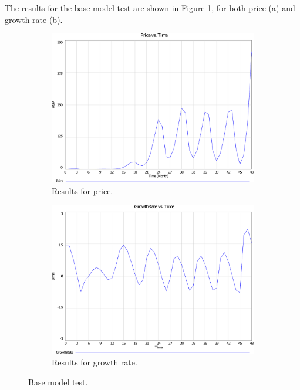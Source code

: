 	The results for the base model test are shown in Figure \ref{img:base}, for both price (a) and growth rate (b).
	\begin{figure}[H]
      \centering
      \begin{subfigure}[t]{0.4\textwidth}
        \includegraphics[scale = 0.3]{files/BasePrice.pdf}
        \centering
        \caption{Results for price.}
      \end{subfigure}
      \hspace{1cm}
      \begin{subfigure}[t]{0.4\textwidth}
        \includegraphics[scale = 0.3]{files/BaseGrowth.pdf}
        \centering
        \caption{Results for growth rate.}
      \end{subfigure}
      \caption{Base model test.}
      \label{img:base}
	\end{figure}
    
